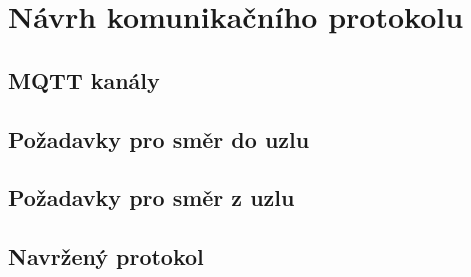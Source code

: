 \chapter{Návrh komunikačního protokolu}
\label{ch:protokol}

\section{MQTT kanály}

\section{Požadavky pro směr do uzlu}

\section{Požadavky pro směr z uzlu}

\section{Navržený protokol}


